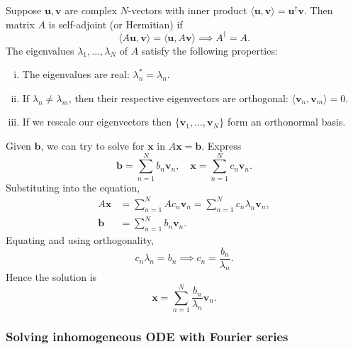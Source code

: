 \documentclass[12pt]{article}
\begin{document}
Suppose $\mathbf{u}, \mathbf{v}$ are complex $N$-vectors with inner product $\langle \mathbf{u}, \mathbf{v} \rangle = \mathbf{u}^{\dagger} \mathbf{v}$. Then matrix $A$ is self-adjoint (or Hermitian) if
\[
	\langle A \mathbf{u}, \mathbf{v} \rangle = \langle \mathbf{u}, A \mathbf{v} \rangle \implies A^{\dagger} = A
.\]
The eigenvalues $\lambda_1, \ldots, \lambda_N$ of $A$ satisfy the following properties:
\begin{enumerate}[(i)]
	\item The eigenvalues are real: $\lambda_n^{\ast} = \lambda_n$.
	\item If $\lambda_n \neq \lambda_m$, then their respective eigenvectors are orthogonal: $\langle \mathbf{v}_n, \mathbf{v}_m \rangle = 0$.
	\item If we rescale our eigenvectors then $\{\mathbf{v}_1, \ldots, \mathbf{v}_N\}$ form an orthonormal basis.
\end{enumerate}

Given $\mathbf{b}$, we can try to solve for $\mathbf{x}$ in $A \mathbf{x} = \mathbf{b}$. Express 
\[
	\mathbf{b} = \sum_{n = 1}^{N} b_n \mathbf{v}_n, \quad \mathbf{x} = \sum_{n = 1}^{N} c_n \mathbf{v}_n
.\]
Substituting into the equation,
\begin{align*}
	A \mathbf{x} &= \sum_{n = 1}^{N} A c_n \mathbf{v}_n = \sum_{n = 1}^{N} c_n \lambda_n \mathbf{v}_n, \\
	\mathbf{b} &= \sum_{n = 1}^{N} b_n \mathbf{v}_n.
\end{align*}
Equating and using orthogonality,
\[
c_n \lambda_n = b_n \implies c_n = \frac{b_n}{\lambda_n}
.\]
Hence the solution is
\[
\mathbf{x} = \sum_{n = 1}^{N}\frac{b_n}{\lambda_n} \mathbf{v}_n
.\]

\subsubsection{Solving inhomogeneous ODE with Fourier series}%
\label{subsub:solving_inhomogeneous_ode_with_fourier_series}
\end{document}
